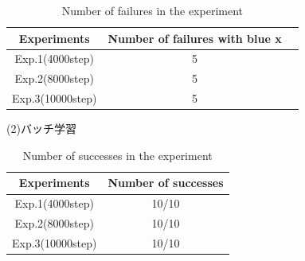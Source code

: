 \begin{table}[h]
  \centering
  \begin{tabular}{|c|c|c|} \hline
    Experiments & Number of failures with blue x \\ \hline
    Exp.1(4000step) & 5 \\ \hline
    Exp.2(8000step) & 5 \\ \hline
    Exp.3(10000step) & 5 \\ \hline
  \end{tabular}
  \caption{Number of failures in the experiment}
  \label{tb:fail2.1}
\end{table}

\newpage
\begin{description}
  \item [(2)バッチ学習]
\end{description}
\begin{table}[h]
  \centering
  \begin{tabular}{|c|c|} \hline
    Experiments & Number of successes \\ \hline
    Exp.1(4000step) & 10/10 \\ \hline
    Exp.2(8000step) & 10/10 \\ \hline
    Exp.3(10000step) & 10/10 \\ \hline
  \end{tabular}
  \caption{Number of successes in the experiment}
  \label{tb:exp2.2}
\end{table}

